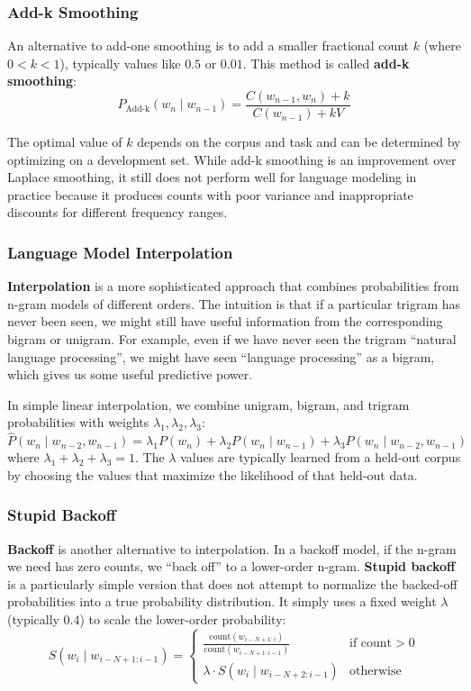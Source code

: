 \documentclass[11pt,a4paper]{article}
\begin{document}
\subsubsection{Add-k Smoothing}

An alternative to add-one smoothing is to add a smaller fractional count $k$ (where $0 < k < 1$), typically values like $0.5$ or $0.01$. This method is called \textbf{add-k smoothing}:
\[
P_{\text{Add-k}}(w_n \mid w_{n-1}) = \frac{C(w_{n-1}, w_n) + k}{C(w_{n-1}) + kV}
\]

The optimal value of $k$ depends on the corpus and task and can be determined by optimizing on a development set. While add-k smoothing is an improvement over Laplace smoothing, it still does not perform well for language modeling in practice because it produces counts with poor variance and inappropriate discounts for different frequency ranges.

\subsubsection{Language Model Interpolation}

\textbf{Interpolation} is a more sophisticated approach that combines probabilities from n-gram models of different orders. The intuition is that if a particular trigram has never been seen, we might still have useful information from the corresponding bigram or unigram. For example, even if we have never seen the trigram ``natural language processing'', we might have seen ``language processing'' as a bigram, which gives us some useful predictive power.

In simple linear interpolation, we combine unigram, bigram, and trigram probabilities with weights $\lambda_1, \lambda_2, \lambda_3$:
\[
\hat{P}(w_n \mid w_{n-2}, w_{n-1}) = \lambda_1 P(w_n) + \lambda_2 P(w_n \mid w_{n-1}) + \lambda_3 P(w_n \mid w_{n-2}, w_{n-1})
\]
where $\lambda_1 + \lambda_2 + \lambda_3 = 1$. The $\lambda$ values are typically learned from a held-out corpus by choosing the values that maximize the likelihood of that held-out data.

\subsubsection{Stupid Backoff}

\textbf{Backoff} is another alternative to interpolation. In a backoff model, if the n-gram we need has zero counts, we ``back off'' to a lower-order n-gram. \textbf{Stupid backoff} is a particularly simple version that does not attempt to normalize the backed-off probabilities into a true probability distribution. It simply uses a fixed weight $\lambda$ (typically 0.4) to scale the lower-order probability:
\[
S(w_i \mid w_{i-N+1:i-1}) =
\begin{cases}
\frac{\text{count}(w_{i-N+1:i})}{\text{count}(w_{i-N+1:i-1})} & \text{if count} > 0 \\
\lambda \cdot S(w_i \mid w_{i-N+2:i-1}) & \text{otherwise}
\end{cases}
\]
\end{document}
